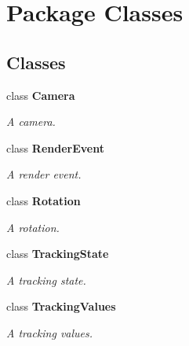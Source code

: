 \section{Package Classes}
\label{namespace_classes}
\subsection*{Classes}
\begin{DoxyCompactItemize}
\item 
class {\bf Camera}
\begin{DoxyCompactList}\small\item\em A camera. \end{DoxyCompactList}\item 
class {\bf Render\-Event}
\begin{DoxyCompactList}\small\item\em A render event. \end{DoxyCompactList}\item 
class {\bf Rotation}
\begin{DoxyCompactList}\small\item\em A rotation. \end{DoxyCompactList}\item 
class {\bf Tracking\-State}
\begin{DoxyCompactList}\small\item\em A tracking state. \end{DoxyCompactList}\item 
class {\bf Tracking\-Values}
\begin{DoxyCompactList}\small\item\em A tracking values. \end{DoxyCompactList}\end{DoxyCompactItemize}
